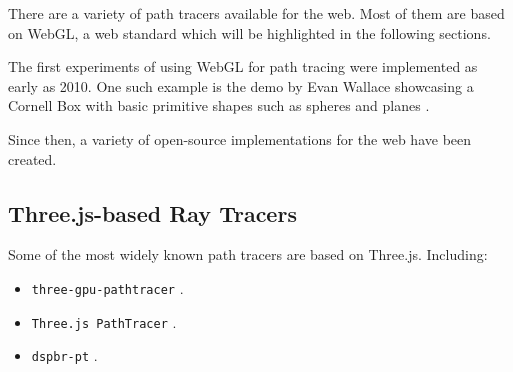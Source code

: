 There are a variety of path tracers available for the web. Most of them are based on WebGL, a web standard which will be highlighted in the following sections.

The first experiments of using WebGL for path tracing were implemented as early as 2010. One such example is the demo by Evan Wallace showcasing a Cornell Box with basic primitive shapes such as spheres and planes \cite{pathTracerWallace}.

Since then, a variety of open-source implementations for the web have been created.

\subsection{Three.js-based Ray Tracers}

Some of the most widely known path tracers are based on Three.js. Including:

\begin{itemize}
    \item {\texttt{three-gpu-pathtracer}} \cite{ThreeJsPathTracerJohnson}.
    \item{\texttt{Three.js PathTracer}} \cite{ThreeJsPathTracerLoftis}.
    \item {\texttt{dspbr-pt}} \cite{PathTracerDassault}.
  \end{itemize}
